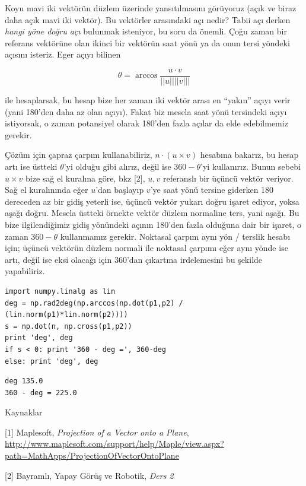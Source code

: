 \documentclass[12pt,fleqn]{article}\usepackage{../../common}
\begin{document}
Koyu mavi iki vektörün düzlem üzerinde yansıtılmasını görüyoruz (açık ve
biraz daha açık mavi iki vektör). Bu vektörler arasındaki açı nedir? Tabii
açı derken {\em hangi yöne doğru açı} bulunmak isteniyor, bu soru da
önemli. Çoğu zaman bir referans vektörüne olan ikinci bir vektörün saat
yönü ya da onun tersi yöndeki açısını isteriz. Eger açıyı bilinen

$$ \theta = \arccos \frac{u \cdot v}{||u||||v|||}$$

ile hesaplarsak, bu hesap bize her zaman iki vektör arası en ``yakın''
açıyı verir (yani 180'den daha az olan açıyı). Fakat biz mesela saat yönü
tersindeki açıyı istiyorsak, o zaman potansiyel olarak 180'den fazla açılar
da elde edebilmemiz gerekir.

Çözüm için çapraz çarpım kullanabiliriz, $n \cdot (u \times v)$ hesabına
bakarız, bu hesap artı ise üstteki $\theta$'yi olduğu gibi alırız, değil
ise $360-\theta$'yi kullanırız. Bunun sebebi $u \times v$ bize sağ el
kuralına göre, bkz [2], $u,v$ referanslı bir üçüncü vektör veriyor. Sağ el
kuralınında eğer $u$'dan başlayıp $v$'ye saat yönü tersine giderken 180
dereceden az bir gidiş yeterli ise, üçüncü vektör yukarı doğru işaret
ediyor, yoksa aşağı doğru. Mesela üstteki örnekte vektör düzlem normaline
ters, yani aşağı. Bu bize ilgilendiğimiz gidiş yönündeki açının 180'den
fazla olduğuna dair bir işaret, o zaman $360 - \theta$ kullanmamız
gerekir. Noktasal çarpım aynı yön / terslik hesabı için; üçüncü vektörün
düzlem normali ile noktasal çarpımı eğer aynı yönde ise artı, değil ise
eksi olacağı için 360'dan çıkartma irdelemesini bu şekilde yapabiliriz.

\begin{verbatim}
import numpy.linalg as lin
deg = np.rad2deg(np.arccos(np.dot(p1,p2) / (lin.norm(p1)*lin.norm(p2))))
s = np.dot(n, np.cross(p1,p2))
print 'deg', deg
if s < 0: print '360 - deg =', 360-deg
else: print 'deg', deg
\end{verbatim}

\begin{verbatim}
deg 135.0
360 - deg = 225.0
\end{verbatim}

Kaynaklar

[1] Maplesoft, {\em Projection of a Vector onto a Plane}, \url{http://www.maplesoft.com/support/help/Maple/view.aspx?path=MathApps/ProjectionOfVectorOntoPlane}

[2] Bayramlı, Yapay Görüş ve Robotik, {\em Ders 2}
\end{document}
